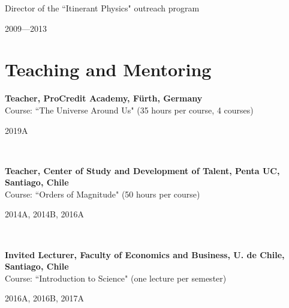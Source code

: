 \documentclass[12pt, a4paper]{article} %
\begin{document}

\begin{minipage}[t]{0.7\textwidth}
\begin{flushleft}%
  \setlength{\leftskip}{0.2cm}%
Director of the ``Itinerant Physics" outreach program
\end{flushleft}
\end{minipage}
\begin{minipage}[t]{0.3\textwidth}
\hfill 2009---2013
\end{minipage}

\section*{Teaching and Mentoring}

\begin{minipage}[t]{0.7\textwidth}
\begin{flushleft}%
  \setlength{\leftskip}{0.2cm}%
\textbf{Teacher, ProCredit Academy, F\"urth, Germany}\\
Course: ``The Universe Around Us" (35 hours per course, 4 courses)
\end{flushleft}
\end{minipage}
\begin{minipage}[t]{0.3\textwidth}
\hfill 2019A
\end{minipage}\\

\begin{minipage}[t]{0.7\textwidth}
\begin{flushleft}%
  \setlength{\leftskip}{0.2cm}%
\textbf{Teacher, Center of Study and Development of Talent, Penta UC, Santiago, Chile}\\
Course: ``Orders of Magnitude" (50 hours per course)
\end{flushleft}
\end{minipage}
\begin{minipage}[t]{0.3\textwidth}
\hfill 2014A, 2014B, 2016A
\end{minipage}\\

\begin{minipage}[t]{0.7\textwidth}
\begin{flushleft}%
  \setlength{\leftskip}{0.2cm}%
\textbf{Invited Lecturer, Faculty of Economics and Business, U. de Chile, Santiago, Chile}\\
Course: ``Introduction to Science" (one lecture per semester)
\end{flushleft}
\end{minipage}
\begin{minipage}[t]{0.3\textwidth}
\hfill 2016A, 2016B, 2017A
\end{minipage}
\end{document}
